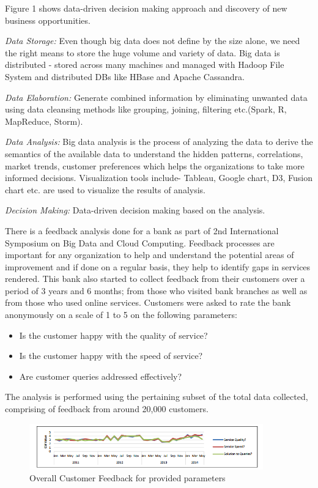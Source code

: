 \documentclass[sigconf]{acmart}
\begin{document}
Figure 1 shows data-driven decision making approach and discovery of new business opportunities.

\textit{Data Storage:} Even though big data does not define by the size alone, we need the right means to store the huge volume and variety of data. Big data is distributed - stored across many machines and managed with Hadoop File System and distributed DBs like HBase and Apache Cassandra\cite{big-data-storage}.

\textit{Data Elaboration:} Generate combined information by eliminating unwanted data using data cleansing methods like grouping, joining, filtering etc.(Spark, R, MapReduce, Storm). 

\textit{Data Analysis:} Big data analysis is the process of analyzing the data to derive the semantics of the available data to understand the hidden patterns, correlations, market trends, customer preferences which helps the organizations to take more informed decisions. Visualization tools include- Tableau, Google chart, D3, Fusion chart etc. are used to visualize the results of analysis.

\textit{Decision Making:} Data-driven decision making based on the analysis.
 
 There is a feedback analysis done for a bank as part of 2nd International Symposium on Big Data and Cloud Computing. Feedback processes are important for any organization to help and understand the potential areas of improvement and if done on a regular basis, they help to identify gaps in services rendered. This bank also started to collect feedback from their customers over a period of 3 years and 6 months; from those who visited bank branches as well as from those who used online services. Customers were asked to rate the bank anonymously on a scale of 1 to 5 on the following parameters: 
 
\begin{itemize}
   \item Is the customer happy with the quality of service?
   \item Is the customer happy with the speed of service?
   \item Are customer queries addressed effectively?
\end{itemize}

The analysis is performed using the pertaining subset of the total data collected, comprising of feedback from around 20,000 customers\cite{bigdata-banking}. 

\begin{figure}
  \centering
  \includegraphics[width=0.9\textwidth]{images/Figure2.png}
  \caption{Overall Customer Feedback for provided parameters 
  \cite{bigdata-banking}}
  \label{fig:Figure2} 
\end{figure}
\end{document}
